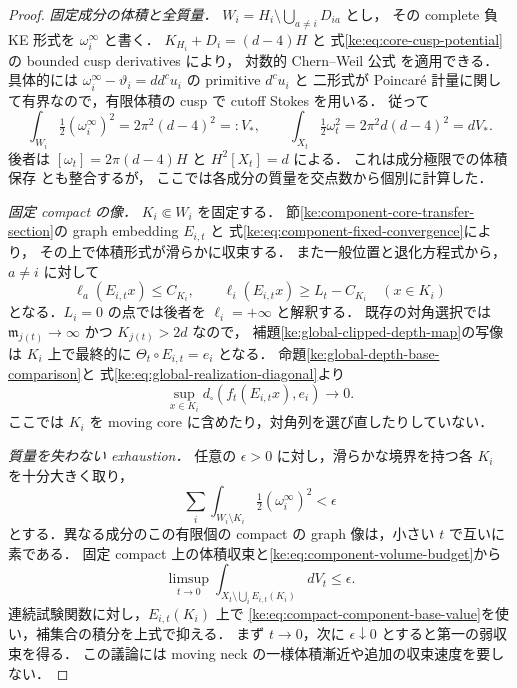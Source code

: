 \begin{proof}
\emph{固定成分の体積と全質量．}
$W_i=H_i\setminus\bigcup_{a\ne i}D_{ia}$ とし，
その complete 負 KE 形式を $\omega_i^\infty$ と書く．
$K_{H_i}+D_i=(d-4)H$ と
式\eqref{ke:eq:core-cusp-potential}の bounded cusp derivatives により，
対数的 Chern--Weil 公式
\cite[\texttt{lem:CW}, \texttt{thm:facemass}]{MultiscaleKECurrent}を適用できる．
具体的には $\omega_i^\infty-\vartheta_i=dd^cu_i$ の primitive $d^cu_i$ と
二形式が Poincar\'e 計量に関して有界なので，有限体積の cusp で cutoff Stokes を用いる．
従って
\begin{equation}\label{ke:eq:component-volume-budget}
 \int_{W_i}\tfrac12(\omega_i^\infty)^2=2\pi^2(d-4)^2=:V_*,
 \qquad
 \int_{X_t}\tfrac12\omega_t^2=2\pi^2d(d-4)^2=dV_*.
\end{equation}
後者は $[\omega_t]=2\pi(d-4)H$ と $H^2[X_t]=d$ による．
これは成分極限での体積保存
\cite[Theorem~1.2(4)]{SongNegativeKE}とも整合するが，
ここでは各成分の質量を交点数から個別に計算した．

\emph{固定 compact の像．}
$K_i\Subset W_i$ を固定する．
節\ref{ke:component-core-transfer-section}の graph embedding $E_{i,t}$ と
式\eqref{ke:eq:component-fixed-convergence}により，
その上で体積形式が滑らかに収束する．
また一般位置と退化方程式から，$a\ne i$ に対して
\[
 \ell_a(E_{i,t}x)\le C_{K_i},\qquad
 \ell_i(E_{i,t}x)\ge L_t-C_{K_i}
 \quad(x\in K_i)
\]
となる．$L_i=0$ の点では後者を $\ell_i=+\infty$ と解釈する．
既存の対角選択では $\mathfrak m_{j(t)}\to\infty$ かつ $K_{j(t)}>2d$ なので，
補題\ref{ke:global-clipped-depth-map}の写像は $K_i$ 上で最終的に
$\Theta_t\circ E_{i,t}=e_i$ となる．
命題\ref{ke:global-depth-base-comparison}と
式\eqref{ke:eq:global-realization-diagonal}より
\begin{equation}\label{ke:eq:compact-component-base-value}
 \sup_{x\in K_i}d_\square(f_t(E_{i,t}x),e_i)\longrightarrow0.
\end{equation}
ここでは $K_i$ を moving core に含めたり，対角列を選び直したりしていない．

\emph{質量を失わない exhaustion．}
任意の $\epsilon>0$ に対し，滑らかな境界を持つ各 $K_i$ を十分大きく取り，
\[
 \sum_i\int_{W_i\setminus K_i}\tfrac12(\omega_i^\infty)^2<\epsilon
\]
とする．異なる成分のこの有限個の compact の graph 像は，小さい $t$ で互いに素である．
固定 compact 上の体積収束と\eqref{ke:eq:component-volume-budget}から
\[
 \limsup_{t\to0}\int_{X_t\setminus\bigcup_iE_{i,t}(K_i)}dV_t
 \le\epsilon.
\]
連続試験関数に対し，$E_{i,t}(K_i)$ 上で
\eqref{ke:eq:compact-component-base-value}を使い，補集合の積分を上式で抑える．
まず $t\to0$，次に $\epsilon\downarrow0$ とすると第一の弱収束を得る．
この議論には moving neck の一様体積漸近や追加の収束速度を要しない．


\end{proof}
